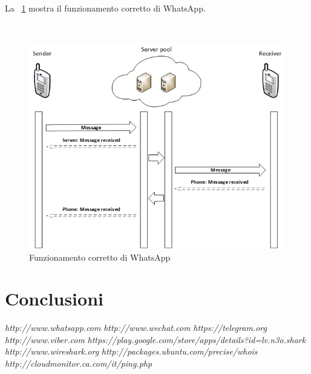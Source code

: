 \documentclass[a4paper,11pt]{book}
\begin{document}
La \figurename ~\ref{fig:lan} mostra il funzionamento corretto di WhatsApp.  

~

\begin{figure}[!ht]
\centering
\includegraphics[scale = 0.8]{true_lan.png}
\caption{Funzionamento corretto di WhatsApp}
\label{fig:lan}
\end{figure}



\chapter{Conclusioni}


\begin{thebibliography}{}
 \emph{http://www.whatsapp.com}
 \emph{http://www.wechat.com}
 \emph{https://telegram.org}
 \emph{http://www.viber.com}
 \emph{https://play.google.com/store/apps/details?id=lv.n3o.shark}
 \emph{http://www.wireshark.org}
 \emph{http://packages.ubuntu.com/precise/whois}
 \emph{http://cloudmonitor.ca.com/it/ping.php}
\end{thebibliography}
\end{document}
